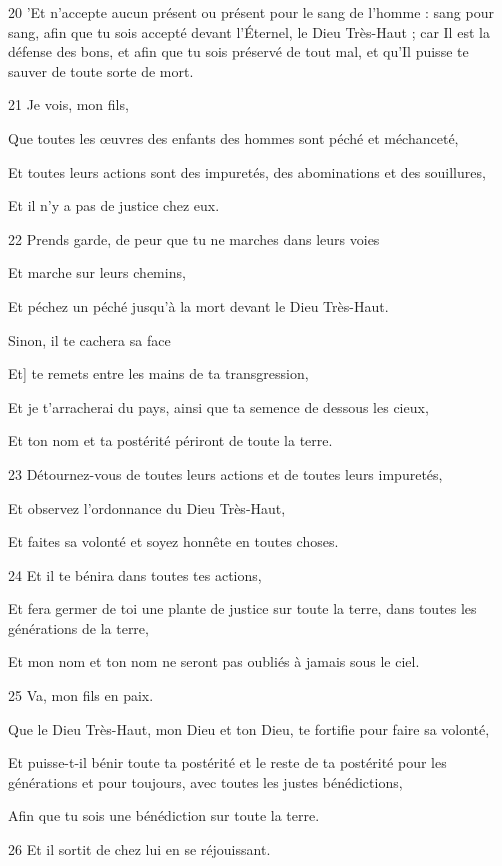 \par 20 'Et n'accepte aucun présent ou présent pour le sang de l'homme : sang pour sang, afin que tu sois accepté devant l'Éternel, le Dieu Très-Haut ; car Il est la défense des bons, et afin que tu sois préservé de tout mal, et qu'Il puisse te sauver de toute sorte de mort.
\par    
\par 21 Je vois, mon fils,  
\par     Que toutes les œuvres des enfants des hommes sont péché et méchanceté,  
\par     Et toutes leurs actions sont des impuretés, des abominations et des souillures,  
\par     Et il n’y a pas de justice chez eux.
\par    
\par 22 Prends garde, de peur que tu ne marches dans leurs voies  
\par     Et marche sur leurs chemins,  
\par     Et péchez un péché jusqu'à la mort devant le Dieu Très-Haut.
\par    
\par     Sinon, il te cachera sa face  
\par     Et] te remets entre les mains de ta transgression,  
\par     Et je t'arracherai du pays, ainsi que ta semence de dessous les cieux,  
\par     Et ton nom et ta postérité périront de toute la terre.
\par    
\par 23 Détournez-vous de toutes leurs actions et de toutes leurs impuretés,  
\par     Et observez l'ordonnance du Dieu Très-Haut,  
\par     Et faites sa volonté et soyez honnête en toutes choses.
\par    
\par 24 Et il te bénira dans toutes tes actions,  
\par     Et fera germer de toi une plante de justice sur toute la terre, dans toutes les générations de la terre,  
\par     Et mon nom et ton nom ne seront pas oubliés à jamais sous le ciel.
\par    
\par 25 Va, mon fils en paix.  
\par     Que le Dieu Très-Haut, mon Dieu et ton Dieu, te fortifie pour faire sa volonté,  
\par     Et puisse-t-il bénir toute ta postérité et le reste de ta postérité pour les générations et pour toujours, avec toutes les justes bénédictions,  
\par     Afin que tu sois une bénédiction sur toute la terre.
\par    
\par 26 Et il sortit de chez lui en se réjouissant.

